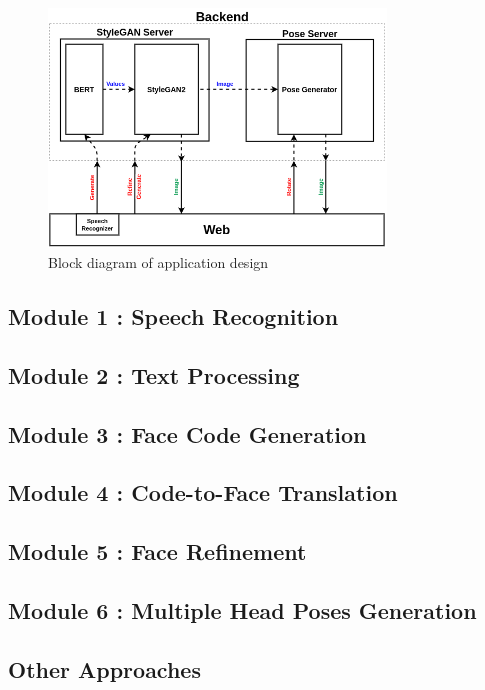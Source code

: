 \begin{figure}[H]
    \centering
    \includegraphics[width=0.8\textwidth]{images/app-design.png}
    \caption{Block diagram of application design}
    \label{fig:app}
\end{figure}

\subsection{Module 1 : Speech Recognition}
\label{sec:speech}


\subsection{Module 2 : Text Processing}
\label{sec:text}


\subsection{Module 3 : Face Code Generation}
\label{sec:code_gen}


\subsection{Module 4 : Code-to-Face Translation}
\label{sec:face_gen}


\subsection{Module 5 : Face Refinement}
\label{sec:face_ref}


\subsection{Module 6 : Multiple Head Poses Generation}
\label{sec:poses}


\subsection{Other Approaches}
\label{sec:other_app}

